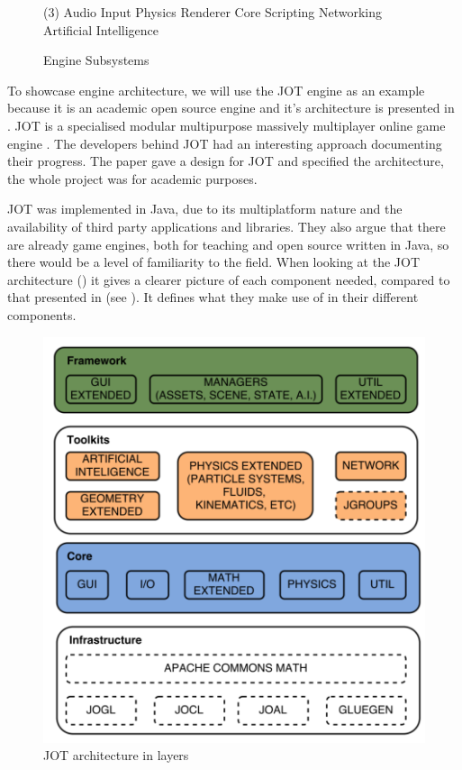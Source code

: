 \begin{figure}[H]
    \centering
    \begin{tasks}[style=itemize, column-sep=0mm, label-align=left, label-offset={0mm}, label-width={10mm}, item-indent={3mm}](3)%
        \task Audio
        \task Input
        \task Physics 
        \task Renderer
        \task Core
        \task Scripting
        \task Networking
        \task Artificial Intelligence
    \end{tasks}
    \caption{Engine Subsystems}
    \label{fig:engine-subsystes}
\end{figure}

To showcase engine architecture, we will use the JOT engine as an example because it is an academic open source engine and it's architecture is presented in \cite{amador2014jot}. JOT is a specialised modular multipurpose massively multiplayer online game engine \cite{amador2014jot}. The developers behind JOT had an interesting approach documenting their progress. The paper gave a design for JOT and specified the architecture, the whole project was for academic purposes.

JOT was implemented in Java, due to its multiplatform nature and the availability of third party applications and libraries. They also argue that there are already game engines, both for teaching and open source written in Java, so there would be a level of familiarity to the field. When looking at the JOT architecture () it gives a clearer picture of each component needed, compared to that presented in \cite{5962102} (see ). It defines what they make use of in their different components.

\begin{figure}[H]
    \centering
    \includegraphics[scale = 0.6]{images/Game-development/Jot-layers.png}
    \caption{JOT architecture in layers \cite{amador2014jot}}
    \label{fig:Jot_layers}
\end{figure}

